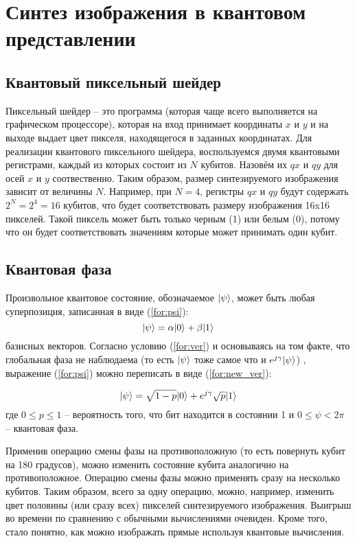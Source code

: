 \section{Синтез изображения в квантовом представлении}

\subsection{Квантовый пиксельный шейдер}

Пиксельный шейдер -- это программа (которая чаще всего выполняется на графическом процессоре), которая на вход принимает координаты $x$ и $y$ и на выходе выдает цвет пикселя, находящегося в заданных координатах. Для реализации квантового пиксельного шейдера, воспользуемся двумя квантовыми регистрами, каждый из которых состоит из $N$ кубитов. Назовём их $qx$ и $qy$ для осей $x$ и $y$ соотвественно. Таким образом, размер синтезируемого изображения зависит от величины $N$. Например, при $N = 4$, регистры $qx$ и $qy$ будут содержать $2^N = 2^4 = 16$ кубитов, что будет соответствовать размеру изображения 16x16 пикселей. Такой пиксель может быть только черным (1) или белым (0), потому что он будет соответствовать значениям которые может принимать один кубит. 

\subsection{Квантовая фаза}

Произвольное квантовое состояние, обозначаемое $\lvert\psi\rangle$, может быть любая суперпозиция, записанная в виде (\ref{for:psi}):
\begin{equation}
	\label{for:psi}
	\lvert\psi\rangle = \alpha\lvert0\rangle + \beta\lvert1\rangle
\end{equation}
 базисных векторов. Согласно условию (\ref{for:ver}) и основываясь на том факте, что глобальная фаза не наблюдаема (то есть $\lvert\psi\rangle$ тоже самое что и $e^{j\gamma}\lvert\psi\rangle$) \cite{global-phase}, выражение (\ref{for:psi}) можно переписать в виде (\ref{for:new_ver}):
 
\begin{equation} 
	\label{for:new_ver}
	\lvert\psi\rangle = \sqrt{1 - p}\lvert0\rangle + e^{j\gamma}\sqrt{p}\lvert1\rangle
\end{equation} где $0 \leq p \leq 1$ -- вероятность того, что бит находится в состоянии 1 и $0 \leq \psi < 2\pi$ -- квантовая фаза.

Применив операцию смены фазы на противоположную (то есть повернуть кубит на 180 градусов), можно изменить состояние кубита аналогично на противоположное. Операцию смены фазы можно применять сразу на несколько кубитов. Таким образом, всего за одну операцию, можно, например, изменить цвет половины (или сразу всех) пикселей синтезируемого изображения. Выигрыш во времени по сравнению с обычными вычислениями очевиден. Кроме того, стало понятно, как можно изображать прямые используя квантовые вычисления. 

